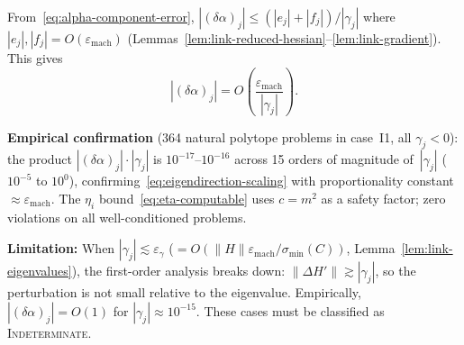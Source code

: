 \begin{remark}
\end{remark}


\begin{remark}%
\label{rem:eigendirection-error}
From~\eqref{eq:alpha-component-error},
$|(\delta\alpha)_j| \leq (|e_j| + |f_j|) / |\gamma_j|$
where $|e_j|, |f_j| = O(\varepsilon_{\mathrm{mach}})$
(Lemmas~\ref{lem:link-reduced-hessian}--\ref{lem:link-gradient}).
This gives
\begin{equation}\label{eq:eigendirection-scaling}
  |(\delta\alpha)_j|
  = O\!\left(\frac{\varepsilon_{\mathrm{mach}}}{|\gamma_j|}\right).
\end{equation}

\textbf{Empirical confirmation}
(364 natural polytope problems in case~I1, all $\gamma_j < 0$):
the product $|(\delta\alpha)_j| \cdot |\gamma_j|$ is
$10^{-17}$--$10^{-16}$ across 15 orders of magnitude of~$|\gamma_j|$
($10^{-5}$ to $10^0$), confirming~\eqref{eq:eigendirection-scaling}
with proportionality constant $\approx \varepsilon_{\mathrm{mach}}$.
The $\eta_i$ bound~\eqref{eq:eta-computable} uses $c = m^2$
as a safety factor; zero violations on all well-conditioned problems.

\textbf{Limitation:}
When $|\gamma_j| \lesssim \varepsilon_\gamma$
($= O(\|H\| \varepsilon_{\mathrm{mach}} / \sigma_{\min}(C))$,
Lemma~\ref{lem:link-eigenvalues}),
the first-order analysis breaks down:
$\|\Delta H'\| \gtrsim |\gamma_j|$, so the perturbation
is not small relative to the eigenvalue.
Empirically, $|(\delta\alpha)_j| = O(1)$ for $|\gamma_j| \approx 10^{-15}$.
These cases must be classified as \textsc{Indeterminate}.

\end{remark}



%

